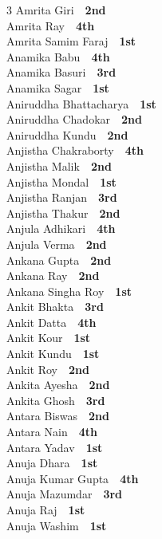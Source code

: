 \documentclass[11pt,a4paper]{article}
\begin{document}
\begin{multicols}{3}
Amrita Giri~\dotfill~\textbf{2nd}\\
Amrita Ray~\dotfill~\textbf{4th}\\
Amrita Samim Faraj~\dotfill~\textbf{1st}\\
Anamika Babu~\dotfill~\textbf{4th}\\
Anamika Basuri~\dotfill~\textbf{3rd}\\
Anamika Sagar~\dotfill~\textbf{1st}\\
Aniruddha Bhattacharya~\dotfill~\textbf{1st}\\
Aniruddha Chadokar~\dotfill~\textbf{2nd}\\
Aniruddha Kundu~\dotfill~\textbf{2nd}\\
Anjistha Chakraborty~\dotfill~\textbf{4th}\\
Anjistha Malik~\dotfill~\textbf{2nd}\\
Anjistha Mondal~\dotfill~\textbf{1st}\\
Anjistha Ranjan~\dotfill~\textbf{3rd}\\
Anjistha Thakur~\dotfill~\textbf{2nd}\\
Anjula Adhikari~\dotfill~\textbf{4th}\\
Anjula Verma~\dotfill~\textbf{2nd}\\
Ankana Gupta~\dotfill~\textbf{2nd}\\
Ankana Ray~\dotfill~\textbf{2nd}\\
Ankana Singha Roy~\dotfill~\textbf{1st}\\
Ankit Bhakta~\dotfill~\textbf{3rd}\\
Ankit Datta~\dotfill~\textbf{4th}\\
Ankit Kour~\dotfill~\textbf{1st}\\
Ankit Kundu~\dotfill~\textbf{1st}\\
Ankit Roy~\dotfill~\textbf{2nd}\\
Ankita Ayesha~\dotfill~\textbf{2nd}\\
Ankita Ghosh~\dotfill~\textbf{3rd}\\
Antara Biswas~\dotfill~\textbf{2nd}\\
Antara Nain~\dotfill~\textbf{4th}\\
Antara Yadav~\dotfill~\textbf{1st}\\
Anuja Dhara~\dotfill~\textbf{1st}\\
Anuja Kumar Gupta~\dotfill~\textbf{4th}\\
Anuja Mazumdar~\dotfill~\textbf{3rd}\\
Anuja Raj~\dotfill~\textbf{1st}\\
Anuja Washim~\dotfill~\textbf{1st}\\

\end{multicols}
\end{document}
